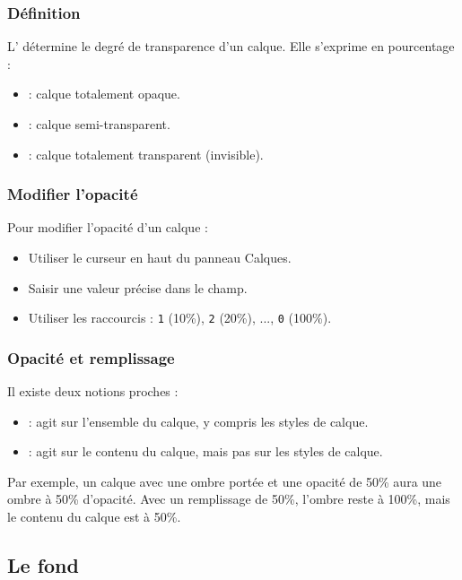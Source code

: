 \subsubsection{Définition}

L' détermine le degré de transparence d'un calque. Elle s'exprime en pourcentage :

\begin{itemize}
    \item {} : calque totalement opaque.
    \item {} : calque semi-transparent.
    \item {} : calque totalement transparent (invisible).
\end{itemize}

\subsubsection{Modifier l'opacité}

Pour modifier l'opacité d'un calque :

\begin{itemize}
    \item Utiliser le curseur  en haut du panneau Calques.
    \item Saisir une valeur précise dans le champ.
    \item Utiliser les raccourcis : \texttt{1} (10\%), \texttt{2} (20\%), ..., \texttt{0} (100\%).
\end{itemize}

\subsubsection{Opacité et remplissage}

Il existe deux notions proches :

\begin{itemize}
    \item {} : agit sur l'ensemble du calque, y compris les styles de calque.
    \item {} : agit sur le contenu du calque, mais pas sur les styles de calque.
\end{itemize}

Par exemple, un calque avec une ombre portée et une opacité de 50\% aura une ombre à 50\% d'opacité. Avec un remplissage de 50\%, l'ombre reste à 100\%, mais le contenu du calque est à 50\%.

\subsection{Le fond}

